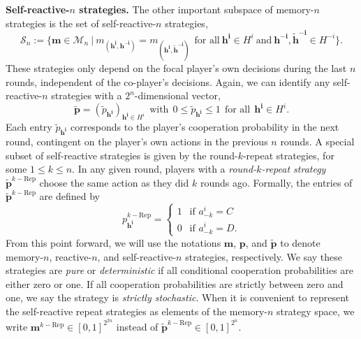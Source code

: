 \documentclass[9pt,twoside,lineno]{pnas-new}
\theoremstyle{plainCl1}
\theoremstyle{plainCl2}
\begin{document}
\noindent
{\bfseries Self-reactive-$n$ strategies.}
The other important subspace of memory-$n$ strategies is the set of self-reactive-$n$ strategies, 
\begin{equation}
\mathcal{S}_n:=\Big\{ \mathbf{m}\!\in\!\mathcal{M}_n ~\Big|~ m_{(\mathbf{h^i},\mathbf{h^{-i}})}\!=\!m_{(\mathbf{h^i},\mathbf{\tilde h^{-i}})}~~\text{for all}~\mathbf{h^i}\!\in\!H^i~\text{and}~\mathbf{h^{-i}},\mathbf{\tilde h^{-i}}\!\in\!H^{-i}\Big\}.
\end{equation}
These strategies only depend on the focal player's own decisions during the last $n$ rounds, independent of the co-player's decisions. 
Again, we can identify any self-reactive-$n$ strategies with a $2^n$-dimensional vector, 
\begin{equation}
\mathbf{\tilde{p}} = (\tilde{p}_\mathbf{h^{i}})_{\mathbf{h^{i}} \in H^i}  ~~\text{with}~~ 0\!\le\!\tilde p_\mathbf{h^i}\!\le\!1 ~~\text{for all}~~ \mathbf{h^i}\!\in\! H^i.
\end{equation}
Each entry $\tilde{p}_{\mathbf{h^{i}}}$ corresponds to the player's cooperation
probability in the next round, contingent on the player's own actions in
the previous $n$ rounds.
A special subset of self-reactive strategies is given by the round-$k$-repeat strategies, for some $1\le
k\le n$. 
In any given round, players with a {\it round-$k$-repeat strategy} $\mathbf{\tilde p}^{k-\text{Rep}}$ choose the same action as they did $k$ rounds ago. 
Formally, the entries of $\mathbf{\tilde p}^{k-\text{Rep}}$ are defined by
\begin{equation} \label{Eq:Repeat}
p^{k-\text{Rep}}_\mathbf{h^i} =
\left\{
\begin{array}{l}
1~~ \text{ if } a^i_{-k}\!=\!C\\[0.1cm]
0~~ \text{ if } a^i_{-k}\!=\!D.
\end{array}
\right.
\end{equation}
From this point forward, we will use the notations $\mathbf{m}$, $\mathbf{p}$,
and $\mathbf{\tilde{p}}$ to denote memory-$n$, reactive-$n$, and
self-reactive-$n$ strategies, respectively. 
We say these strategies are {\it pure} or {\it deterministic} if all conditional cooperation probabilities are either zero or one. 
If all cooperation probabilities are strictly between zero and one, we say the strategy is {\it strictly stochastic}. 
When it is convenient to represent the self-reactive repeat strategies as elements of the memory-$n$ strategy space, we write $\mathbf{m}^{k-\text{Rep}}\!\in\![0,1]^{2^{2n}}$ instead of $\mathbf{\tilde p}^{k-\text{Rep}}\!\in\![0,1]^{2^n}$.
\end{document}
